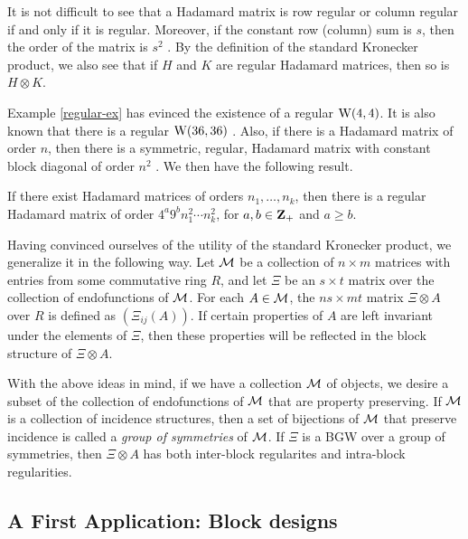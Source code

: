 \documentclass[../../../main]{subfiles}
\begin{document}
 It is not difficult to see that a Hadamard matrix is row regular or column
 regular if and only if it is regular. Moreover, if the constant row (column)
 sum is $s$, then the order of the matrix is $s^2$ \cite[see][Chapter
 4]{combinatorial-designs}. By the definition of the standard Kronecker product,
 we also see that if $H$ and $K$ are regular Hadamard matrices, then so is $H
 \otimes K$. 
 
 Example \ref{regular-ex} has evinced the existence of a regular $\text{W}(4,4)$. It is also known that there is a regular $\text{W}(36,36)$ \cite[see][Chapter 4]{combinatorial-designs}. Also, if there is a Hadamard matrix of order $n$, then there is a symmetric, regular, Hadamard matrix with constant block diagonal of order $n^2$ \cite[see][Part V]{handbook}. We then have the following result.
 
 \begin{prop}
  If there exist Hadamard matrices of orders $n_1, \dots, n_k$, then there is a regular Hadamard matrix of order $4^a9^bn_1^2\cdots n_k^2$, for $a,b \in \mathbf{Z}_+$ and $a \geq b$.
 \end{prop}
 
 Having convinced ourselves of the utility of the standard Kronecker product, we
 generalize it in the following way. Let $\mathcal{M}$ be a collection of $n \times m$
 matrices with entries from some commutative ring $R$, and let $\Xi$ be an $s
 \times t$ matrix over the collection of endofunctions of $\mathcal{M}$. For each $A \in
 \mathcal{M}$, the $ns \times mt$ matrix $\Xi \otimes A$ over $R$ is defined as
 $(\Xi_{ij}(A))$. If certain properties of $A$ are left invariant under the
 elements of $\Xi$, then these properties will be reflected in the block
 structure of $\Xi \otimes A$. 
 
 With the above ideas in mind, if we have a collection $\mathcal{M}$ of objects, we desire a subset of the collection of endofunctions of $\mathcal{M}$ that are property preserving. If $\mathcal{M}$ is a collection of incidence structures, then a set of bijections of $\mathcal{M}$ that preserve incidence is called a {\it group of symmetries} of $\mathcal{M}$. If $\Xi$ is a BGW over a group of symmetries, then $\Xi \otimes A$ has both inter-block regularites and intra-block regularities.
 
 \dinkus
 
\subsection{A First Application: Block designs}
\end{document}
